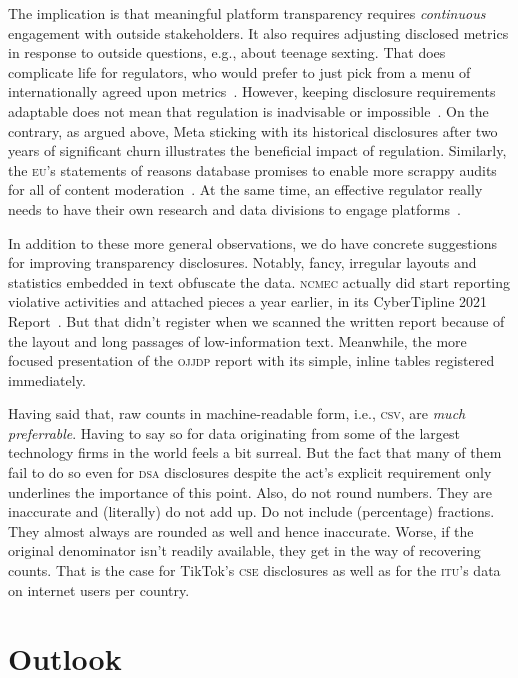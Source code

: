 \documentclass[nonacm,screen]{acmart}
\newcommand\V[1]{\textsc{\MakeLowercase{#1}}}
\begin{document}
\begin{itemize}
{The implication is that meaningful platform transparency requires
\emph{continuous} engagement with outside stakeholders. It also requires
adjusting disclosed metrics in response to outside questions, e.g., about
teenage sexting. That does complicate life for regulators, who would prefer to
just pick from a menu of internationally agreed upon
metrics~\cite{HarlingHenesyea2023}. However, keeping disclosure requirements
adaptable does not mean that regulation is inadvisable or
impossible~\cite{Douek2022,Klonick2023}. On the contrary, as argued above, Meta
sticking with its historical disclosures after two years of significant churn
illustrates the beneficial impact of regulation. Similarly, the \V{EU}'s
statements of reasons database promises to enable more scrappy audits for all of
content moderation~\cite{TrujilloFagniea2024}. At the same time, an effective
regulator really needs to have their own research and data divisions to engage
platforms~\cite{Jaursch2022a,Jaursch2023}.

In addition to these more general observations, we do have concrete suggestions
for improving transparency disclosures. Notably, fancy, irregular layouts and
statistics embedded in text obfuscate the data. \V{NCMEC} actually did start
reporting violative activities and attached pieces a year earlier, in its
CyberTipline 2021 Report~\cite{NcmecCyberTipline2021}. But that didn't register
when we scanned the written report because of the layout and long passages of
low-information text. Meanwhile, the more focused presentation of the \V{OJJDP}
report with its simple, inline tables registered immediately.

Having said that, raw counts in machine-readable form, i.e., \V{CSV}, are
\emph{much preferrable}. Having to say so for data originating from some of the
largest technology firms in the world feels a bit surreal. But the fact that
many of them fail to do so even for \V{DSA} disclosures despite the act's
explicit requirement only underlines the importance of this point. Also, do not
round numbers. They are inaccurate and (literally) do not add up. Do not include
(percentage) fractions. They almost always are rounded as well and hence
inaccurate. Worse, if the original denominator isn't readily available, they get
in the way of recovering counts. That is the case for TikTok's \V{CSE}
disclosures as well as for the \V{ITU}'s data on internet users per country.


\section{Outlook}
\label{sec:outlook}

}
\end{itemize}
\end{document}
